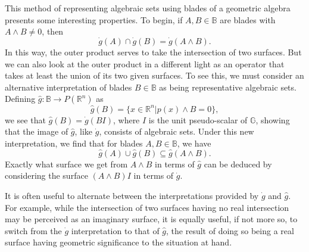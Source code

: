 \documentclass{birkjour}
\theoremstyle{definition}
\theoremstyle{remark}
\numberwithin{equation}{section}
\newcommand{\R}{\mathbb{R}}
\newcommand{\B}{\mathbb{B}}
\newcommand{\G}{\mathbb{G}}
\newcommand{\gd}{\dot{g}}
\newcommand{\gh}{\hat{g}}
\begin{document}
This method of representing algebraic sets using blades of a geometric algebra presents
some interesting properties.  To begin, if $A,B\in\B$ are blades with $A\wedge B\neq 0$,
then
\begin{equation*}
\gd(A)\cap\gd(B)=\gd(A\wedge B).
\end{equation*}
In this way, the outer product serves to take the intersection of two surfaces.  But we can also
look at the outer product in a different light as an operator that takes at least the union
of its two given surfaces.  To see this, we must consider an alternative interpretation
of blades $B\in\B$ as being representative algebraic sets.  Defining $\gh:\B\to P(\R^n)$ as
\begin{equation}\label{equ_gh}
\gh(B)=\{x\in\R^n|p(x)\wedge B=0\},
\end{equation}
we see that $\gh(B)=\gd(BI)$, where $I$ is the unit pseudo-scalar of $\G$, showing
that the image of $\gh$, like $\gd$, consists of algebraic sets.
Under this new interpretation, we find that for blades $A,B\in\B$, we have
\begin{equation*}
\gh(A)\cup\gh(B)\subseteq\gh(A\wedge B).
\end{equation*}
Exactly what surface we get from $A\wedge B$ in terms of $\gh$ can
be deduced by considering the surface $(A\wedge B)I$ in terms of $\gd$.

It is often useful to alternate between the interpretations provided by $\gd$ and $\gh$.
For example, while the intersection of two surfaces having no real intersection
may be perceived as an imaginary
surface, it is equally useful, if not more so, to switch from the $\gd$ interpretation to that of $\gh$,
the result of doing so being a real surface having geometric significance to the situation at hand.
\end{document}
